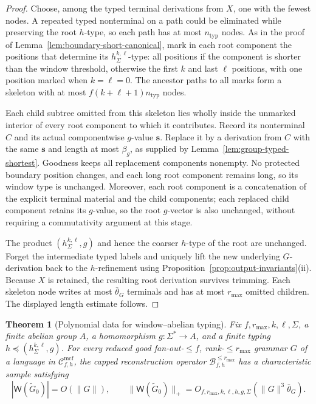 \documentclass[11pt]{article}
\numberwithin{equation}{section}
\theoremstyle{plain}
\newtheorem{theorem}{Theorem}[section]
\theoremstyle{definition}
\theoremstyle{remark}
\newcommand{\Wit}{\mathsf{W}}
\newcommand{\Cmcf}[2]{\mathcal{C}^{\mathrm{mcf}}_{#1,#2}}
\theoremstyle{plain}
\begin{document}
\begin{proof}
Choose, among the typed terminal derivations
from $X$, one with the fewest nodes.
A repeated typed nonterminal on a path
could be eliminated while preserving the
root $h$-type, so each path has at most
$n_{\mathrm{typ}}$ nodes.
As in the proof of
Lemma~\ref{lem:boundary-short-canonical},
mark in each root component the positions
that determine its $h_\Sigma^{k,\ell}$-type:
all positions if the component is shorter
than the window threshold, otherwise the
first $k$ and last $\ell$ positions, with
one position marked when $k=\ell=0$.
The ancestor paths to all marks form a
skeleton with at most
$f(k+\ell+1)n_{\mathrm{typ}}$ nodes.

Each child subtree omitted from this
skeleton lies wholly inside the unmarked
interior of every root component to which
it contributes. Record its nonterminal
$C$ and its actual componentwise $g$-value
$\mathbf s$. Replace it by a derivation
from $C$ with the same $\mathbf s$
and length at most $\beta_g$, as supplied
by Lemma~\ref{lem:group-typed-shortest}.
Goodness keeps all replacement components
nonempty. No protected boundary position
changes, and each long root component
remains long, so its window type is
unchanged. Moreover, each root component
is a concatenation of the explicit
terminal material and the child components;
each replaced child component retains its
$g$-value, so the root $g$-vector is also
unchanged, without requiring a
commutativity argument at this stage.

The product $(h_\Sigma^{k,\ell},g)$ and hence
the coarser $h$-type of the root are
unchanged. Forget the intermediate typed
labels and uniquely lift the new
underlying $G$-derivation back to the
$h$-refinement using
Proposition~\ref{prop:output-invariants}(ii).
Because $X$ is retained, the resulting
root derivation survives trimming.
Each skeleton node writes at most
$\bar\theta_G$ terminals and has at most
$r_{\max}$ omitted children. The
displayed length estimate follows.
\end{proof}

\begin{theorem}[Polynomial data for window--abelian typing]
\label{thm:window-abelian-polydata-v82}
Fix $f,r_{\max},k,\ell,\Sigma$, a
finite abelian group $A$, a homomorphism
$g:\Sigma^*\to A$, and a finite typing
$h\preceq(h_\Sigma^{k,\ell},g)$.
For every reduced good fan-out-$\le f$,
rank-$\le r_{\max}$ grammar $G$ of a
language in $\Cmcf{f}{h}$, the capped
reconstruction operator $\mathcal B^{\le r_{\max}}_{f,h}$
has a characteristic sample
satisfying
\[
 |\Wit(\widetilde G_0)|=O(\|G\|),\qquad
 \|\Wit(\widetilde G_0)\|_+
   =O_{f,r_{\max},k,\ell,h,g,\Sigma}
     (\|G\|^3\bar\theta_G).
\]
\end{theorem}
\end{document}
